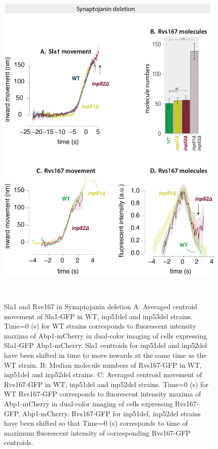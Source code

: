 		\begin{figure}
		\centering
		\includegraphics[width=17cm,height=17cm,keepaspectratio]{figures/results_final/inp_movement3}
		\caption{Sla1 and Rvs167 in Synaptojanin deletion 
		{A: Averaged centroid movement of Sla1-GFP in WT, inp51del and inp53del strains. Time=0 (s) for WT strains corresponds to fluorescent intensity maxima of Abp1-mCherry in dual-color imaging of cells expressing Sla1-GFP Abp1-mCherry. Sla1 centroids for inp51del and inp52del have been shifted in time to move inwards at the same time as the WT strain. 
		B: Median molecule numbers of Rvs167-GFP in WT, inp51del and inp52del strains. 
		C: Averaged centroid movement of Rvs167-GFP in WT, inp51del and inp52del strains. Time=0 (s) for WT  Rvs167-GFP corresponds to fluorescent intensity maxima of Abp1-mCherry in dual-color imaging of cells expressing Rvs167-GFP, Abp1-mCherry. Rvs167-GFP for inp51del, inp52del strains have been shifted so that Time=0 (s) corresponds to time of maximum fluorescent intensity of corresponding Rvs167-GFP centroids. 
		}	
		\label{fig5}}
		\end{figure}		

